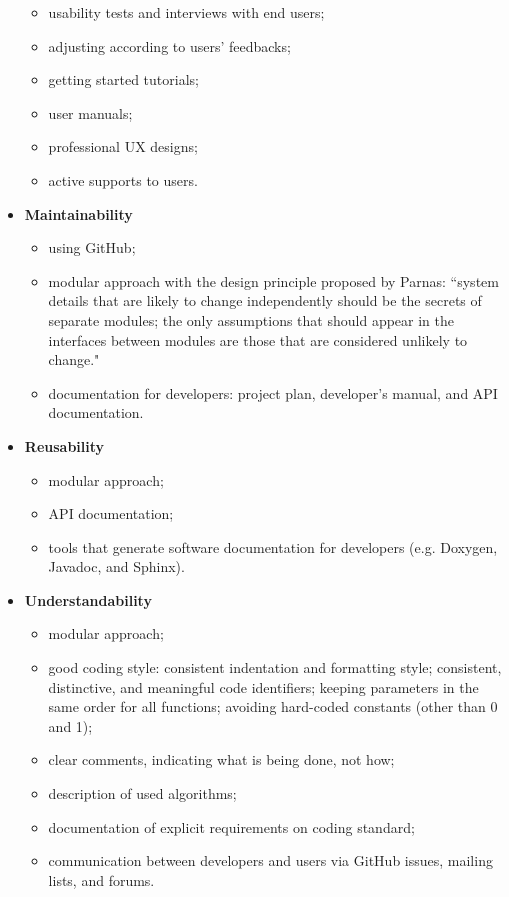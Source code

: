\begin{itemize}
\begin{itemize}
    \item usability tests and interviews with end users;
    \item adjusting according to users’ feedbacks;
    \item getting started tutorials;
    \item user manuals;
    \item professional UX designs;
    \item active supports to users.
\end{itemize}
\item \textbf{Maintainability}
\begin{itemize}
    \item using GitHub;
    \item modular approach with the design principle proposed by Parnas: ``system details that are likely to change independently should be the secrets of separate modules; the only assumptions that should appear in the interfaces between modules are those that are considered unlikely to change." \cite{ParnasEtAl2000}
    \item documentation for developers: project plan, developer’s manual, and API documentation.
\end{itemize}
\item \textbf{Reusability}
\begin{itemize}
    \item modular approach;
    \item API documentation;
    \item tools that generate software documentation for developers (e.g. Doxygen, Javadoc, and Sphinx).
\end{itemize}
\item \textbf{Understandability}
\begin{itemize}
    \item modular approach;
    \item good coding style: consistent indentation and formatting style; consistent, distinctive, and meaningful code identifiers; keeping parameters in the same order for all functions; avoiding hard-coded constants (other than 0 and 1);
    \item clear comments, indicating what is being done, not how;
    \item description of used algorithms;
    \item documentation of explicit requirements on coding standard;
    \item communication between developers and users via GitHub issues, mailing lists, and forums.

\end{itemize}
\end{itemize}
